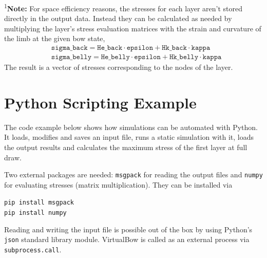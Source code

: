 \documentclass[12pt]{article}
\begin{document}
\textsuperscript{1}\textbf{Note:} For space efficiency reasons, the stresses for each layer aren't stored directly in the output data. Instead they can be calculated as needed by multiplying the layer's stress evaluation matrices with the strain and curvature of the limb at the given bow state,
%
\begin{align*}
&\mathrm{\texttt{sigma\_back}} = \mathrm{\texttt{He\_back}} \cdot \mathrm{\texttt{epsilon}} + \mathrm{\texttt{Hk\_back}} \cdot \mathrm{\texttt{kappa}}\\
&\mathrm{\texttt{sigma\_belly}} = \mathrm{\texttt{He\_belly}} \cdot \mathrm{\texttt{epsilon}} + \mathrm{\texttt{Hk\_belly}} \cdot \mathrm{\texttt{kappa}}
\end{align*}
%
The result is a vector of stresses corresponding to the nodes of the layer.


\newpage
\section{Python Scripting Example}
\label{sec:scripting-examples}

The code example below shows how simulations can be automated with Python. It loads, modifies and saves an input file, runs a static simulation with it, loads the output results and calculates the maximum stress of the first layer at full draw.

Two external packages are needed: \texttt{msgpack} for reading the output files and \texttt{numpy} for evaluating stresses (matrix multiplication). They can be installed via

\smallskip

\begin{framed}
\texttt{pip install msgpack}\\
\texttt{pip install numpy}
\end{framed}

Reading and writing the input file is possible out of the box by using Python's \texttt{json} standard library module. VirtualBow is called as an external process via \texttt{subprocess.call}.

\end{document}
